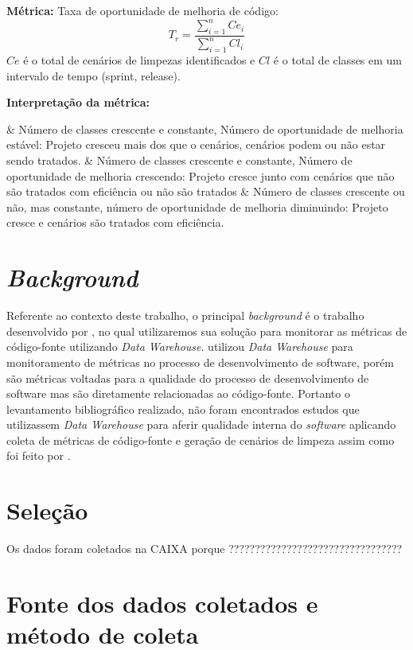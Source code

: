 \textbf{Métrica:} Taxa de oportunidade de melhoria de código: $$ T_r =   \frac{{\sum_{i=1}^{n}{Ce_i}}}{\sum_{i=1}^{n}{Cl_i}} $$ $ Ce $ é o total de cenários de limpezas identificados e $ Cl $  é o total de classes em um intervalo de tempo (sprint, release).

\textbf{Interpretação da métrica: } 

\begin{easylist}[itemize]	
	& Número de classes crescente e constante, Número de oportunidade de melhoria estável: Projeto cresceu mais dos 	que o cenários, cenários podem ou não estar sendo tratados.
	& Número de classes crescente e constante, Número de oportunidade de melhoria crescendo: Projeto cresce junto 		com cenários que não são tratados com eficiência ou não são tratados
	& Número de classes crescente ou não, mas constante, número de oportunidade de melhoria diminuindo: Projeto 		cresce e cenários são tratados com eficiência.	
	\end{easylist}	
	

\section{\textit{Background}}

Referente ao contexto deste trabalho, o principal \textit{background} é o trabalho desenvolvido por , no qual utilizaremos sua solução para monitorar as métricas de código-fonte utilizando \textit{Data Warehouse}.
 utilizou \textit{Data Warehouse} para monitoramento de métricas no processo de desenvolvimento de software, porém são métricas voltadas para a qualidade do processo de desenvolvimento de software mas são diretamente relacionadas ao código-fonte. Portanto o levantamento bibliográfico realizado, não foram encontrados estudos que utilizassem \textit{Data Warehouse} para aferir qualidade interna do \textit{software }aplicando coleta de métricas de código-fonte e geração de cenários de limpeza assim como foi feito por .

\section{Seleção}

Os dados foram coletados na CAIXA porque ?????????????????????????????????

\section{Fonte dos dados coletados e método de coleta}

